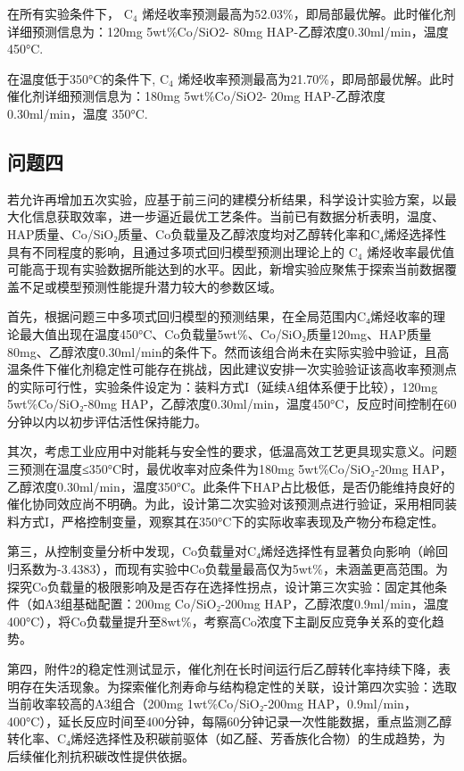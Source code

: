 在所有实验条件下， \( \text{C}_4 \) 烯烃收率预测最高为52.03\%，即局部最优解。此时催化剂详细预测信息为：120mg 5wt\%Co/SiO2- 80mg HAP-乙醇浓度0.30ml/min，温度 450°C.

在温度低于350°C的条件下, \( \text{C}_4 \) 烯烃收率预测最高为21.70\%，即局部最优解。此时催化剂详细预测信息为：180mg 5wt\%Co/SiO2- 20mg HAP-乙醇浓度0.30ml/min，温度 350°C.



\subsection{问题四}

若允许再增加五次实验，应基于前三问的建模分析结果，科学设计实验方案，以最大化信息获取效率，进一步逼近最优工艺条件。当前已有数据分析表明，温度、HAP质量、Co/SiO₂质量、Co负载量及乙醇浓度均对乙醇转化率和C₄烯烃选择性具有不同程度的影响，且通过多项式回归模型预测出理论上的 \( \text{C}_4 \) 烯烃收率最优值可能高于现有实验数据所能达到的水平。因此，新增实验应聚焦于探索当前数据覆盖不足或模型预测性能提升潜力较大的参数区域。

首先，根据问题三中多项式回归模型的预测结果，在全局范围内C₄烯烃收率的理论最大值出现在温度450°C、Co负载量5wt\%、Co/SiO₂质量120mg、HAP质量80mg、乙醇浓度0.30ml/min的条件下。然而该组合尚未在实际实验中验证，且高温条件下催化剂稳定性可能存在挑战，因此建议安排一次实验验证该高收率预测点的实际可行性，实验条件设定为：装料方式I（延续A组体系便于比较），120mg 5wt\%Co/SiO₂-80mg HAP，乙醇浓度0.30ml/min，温度450°C，反应时间控制在60分钟以内以初步评估活性保持能力。

其次，考虑工业应用中对能耗与安全性的要求，低温高效工艺更具现实意义。问题三预测在温度≤350°C时，最优收率对应条件为180mg 5wt\%Co/SiO₂-20mg HAP，乙醇浓度0.30ml/min，温度350°C。此条件下HAP占比极低，是否仍能维持良好的催化协同效应尚不明确。为此，设计第二次实验对该预测点进行验证，采用相同装料方式I，严格控制变量，观察其在350°C下的实际收率表现及产物分布稳定性。

第三，从控制变量分析中发现，Co负载量对C₄烯烃选择性有显著负向影响（岭回归系数为-3.4383），而现有实验中Co负载量最高仅为5wt\%，未涵盖更高范围。为探究Co负载量的极限影响及是否存在选择性拐点，设计第三次实验：固定其他条件（如A3组基础配置：200mg Co/SiO₂-200mg HAP，乙醇浓度0.9ml/min，温度400°C），将Co负载量提升至8wt\%，考察高Co浓度下主副反应竞争关系的变化趋势。

第四，附件2的稳定性测试显示，催化剂在长时间运行后乙醇转化率持续下降，表明存在失活现象。为探索催化剂寿命与结构稳定性的关联，设计第四次实验：选取当前收率较高的A3组合（200mg 1wt\%Co/SiO₂-200mg HAP，0.9ml/min，400°C），延长反应时间至400分钟，每隔60分钟记录一次性能数据，重点监测乙醇转化率、C₄烯烃选择性及积碳前驱体（如乙醛、芳香族化合物）的生成趋势，为后续催化剂抗积碳改性提供依据。


